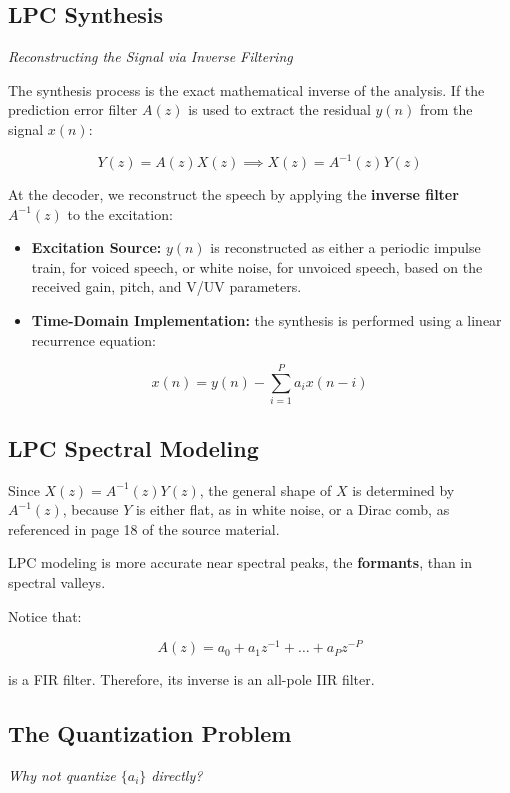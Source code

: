 \subsection{LPC Synthesis}

\textit{Reconstructing the Signal via Inverse Filtering}

The synthesis process is the exact mathematical inverse of the analysis. If the prediction error filter $A(z)$ is used to extract the residual $y(n)$ from the signal $x(n)$:

\[
Y(z) = A(z)X(z) \implies X(z) = A^{-1}(z)Y(z)
\]

At the decoder, we reconstruct the speech by applying the \textbf{inverse filter} $A^{-1}(z)$ to the excitation:

\begin{itemize}
\item \textbf{Excitation Source:} $y(n)$ is reconstructed as either a periodic impulse train, for voiced speech, or white noise, for unvoiced speech, based on the received gain, pitch, and V/UV parameters.
\item \textbf{Time-Domain Implementation:} the synthesis is performed using a linear recurrence equation:
\end{itemize}

\[
x(n) = y(n) - \sum_{i=1}^{P} a_i x(n-i)
\]

\subsection{LPC Spectral Modeling}

Since $X(z) = A^{-1}(z)Y(z)$, the general shape of $X$ is determined by $A^{-1}(z)$, because $Y$ is either flat, as in white noise, or a Dirac comb, as referenced in page 18 of the source material.

LPC modeling is more accurate near spectral peaks, the \textbf{formants}, than in spectral valleys.

Notice that:

\[
A(z) = a_0 + a_1 z^{-1} + \ldots + a_P z^{-P}
\]

is a FIR filter. Therefore, its inverse is an all-pole IIR filter.

\subsection{The Quantization Problem}

\textit{Why not quantize $\{a_i\}$ directly?}

